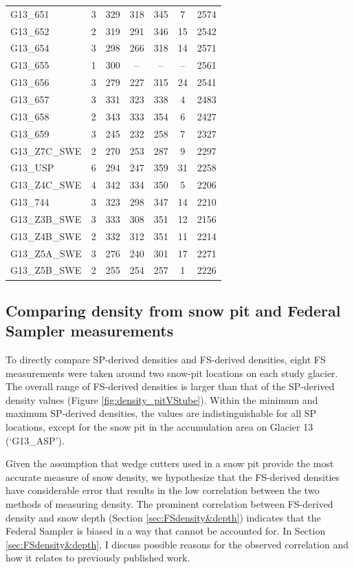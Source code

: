\documentclass{sfuthesis}
\begin{document}
{\begin{table}
\begin{tabular}{lcccccc}
G13\_651 & 3 & 329 & 318 & 345 & 7  & 2574\\
G13\_652 & 2 & 319 & 291 & 346 & 15  & 2542\\
G13\_654 & 3 & 298 & 266 & 318 & 14  & 2571\\
G13\_655 & 1 & 300 &-- & -- & --  & 2561\\
G13\_656 & 3 & 279 & 227 & 315 & 24  & 2541\\
G13\_657 & 3 & 331 & 323 & 338 & 4  & 2483\\
G13\_658 & 2 & 343 & 333 & 354 & 6  & 2427\\
G13\_659 & 3 & 245 & 232 & 258 & 7 & 2327 \\
G13\_Z7C\_SWE & 2 & 270 & 253 & 287 & 9  & 2297\\
G13\_USP & 6 & 294 & 247 & 359 & 31  & 2258\\
G13\_Z4C\_SWE & 4 & 342 & 334 & 350 & 5 & 2206 \\
G13\_744 & 3 & 323 & 298 & 347 & 14 & 2210 \\
G13\_Z3B\_SWE & 3 & 333 & 308 & 351 & 12 & 2156 \\
G13\_Z4B\_SWE & 2 & 332 & 312 & 351 & 11  & 2214\\
G13\_Z5A\_SWE & 3 & 276 & 240 & 301 & 17  & 2271\\
G13\_Z5B\_SWE & 2 & 255 & 254 & 257 & 1 & 2226
\end{tabular}
\end{table}

\subsection{Comparing density from snow pit and Federal Sampler measurements}

To directly compare SP-derived densities and FS-derived densities, eight FS measurements were taken around two snow-pit locations on each study glacier.  The overall range of FS-derived densities is larger than that of the SP-derived density values (Figure \ref{fig:density_pitVStube}). Within the minimum and maximum SP-derived densities, the values are indistinguishable for all SP locations, except for the snow pit in the accumulation area on Glacier 13 (`G13\_ASP').

{\color{red} Given the assumption that wedge cutters used in a snow pit provide the most accurate measure of snow density, we hypothesize that the FS-derived densities have considerable error that results in the low correlation between the two methods of measuring density. The prominent correlation between FS-derived density and snow depth (Section \ref{sec:FSdensity&depth}) indicates that the Federal Sampler is biased in a way that cannot be accounted for. In Section \ref{sec:FSdensity&depth}, I discuss possible reasons for the observed correlation and how it relates to previously published work. }

}
\end{document}
